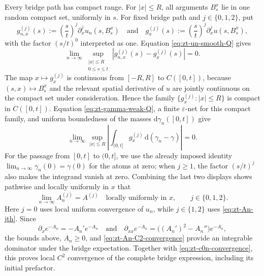 \documentclass[10pt]{amsart}
\theoremstyle{definition}
\theoremstyle{remark}
\numberwithin{equation}{section}
\newcommand{\1}{\mathbf 1}
\newcommand{\dd}{\,\mathrm d}
\begin{document}
Every bridge path has compact range.  For $|x|\leq R$, all arguments $B_s^x$ lie in one random compact set, uniformly in $s$.  For fixed bridge path and $j\in\{0,1,2\}$, put
\begin{equation*}
 g_{n,x}^{(j)}(s)
 :=\left(\frac{s}{t}\right)^j
   \partial_x^ju_n(s,B_s^x)
 \quad\text{and}\quad
 g_x^{(j)}(s)
 :=\left(\frac{s}{t}\right)^j
   \partial_x^ju(s,B_s^x),
\end{equation*}
with the factor $(s/t)^0$ interpreted as one.  Equation \eqref{eq:zt-un-smooth-Q} gives
\begin{equation*}
 \lim_{n\to\infty}
 \sup_{\substack{|x|\leq R\\0\leq s\leq t}}
 |g_{n,x}^{(j)}(s)-g_x^{(j)}(s)|=0.
\end{equation*}
The map $x\mapsto g_x^{(j)}$ is continuous from $[-R,R]$ to $C([0,t])$, because $(s,x)\mapsto B_s^x$ and the relevant spatial derivative of $u$ are jointly continuous on the compact set under consideration.  Hence the family $\{g_x^{(j)}:|x|\leq R\}$ is compact in $C([0,t])$.  Equation \eqref{eq:zt-gamma-weak-Q}, a finite $\varepsilon$-net for this compact family, and uniform boundedness of the masses $\mathrm d\gamma_n([0,t])$ give
\begin{equation*}
 \lim_{n\to\infty}
 \sup_{|x|\leq R}
 \left|\int_{(0,t]}g_x^{(j)}\dd(\gamma_n-\gamma)\right|=0.
\end{equation*}
For the passage from $[0,t]$ to $(0,t]$, we use the already imposed identity $\lim_{n\to\infty}\gamma_n(0)=\gamma(0)$ for the atoms at zero; when $j\geq1$, the factor $(s/t)^j$ also makes the integrand vanish at zero. Combining the last two displays shows pathwise and locally uniformly in $x$ that
\begin{equation}
 \lim_{n\to\infty}A_n^{(j)}=A^{(j)}
 \quad\text{locally uniformly in }x,
 \qquad j\in\{0,1,2\}.
 \label{eq:zt-An-C2-convergence}
\end{equation}
Here $j=0$ uses local uniform convergence of $u_n$, while $j\in\{1,2\}$ uses \eqref{eq:zt-An-jth}. Since
\begin{equation*}
 \partial_xe^{-A_n}=-A_n'e^{-A_n}
 \quad\text{and}\quad
 \partial_{xx}e^{-A_n}=\bigl((A_n')^2-A_n''\bigr)e^{-A_n},
\end{equation*}
the bounds above, $A_n\geq0$, and \eqref{eq:zt-An-C2-convergence} provide an integrable dominator under the bridge expectation. Together with \eqref{eq:zt-c0n-convergence}, this proves local $C^2$ convergence of the complete bridge expression, including its initial prefactor.
\end{document}
